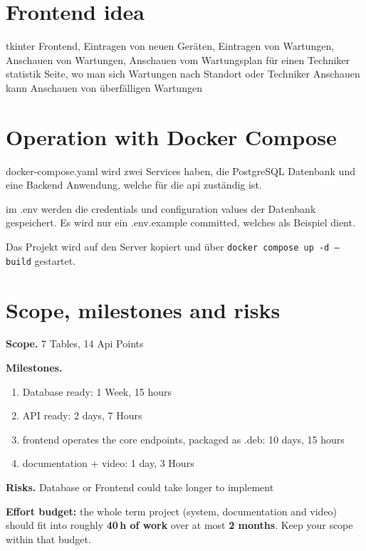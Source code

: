 \documentclass[11pt,a4paper]{article}
\begin{document}
\section{Frontend idea}

tkinter Frontend, 
Eintragen von neuen Geräten, Eintragen von Wartungen, 
Anschauen von Wartungen, Anschauen vom Wartungsplan für einen Techniker
statistik Seite, wo man sich Wartungen nach Standort oder Techniker Anschauen kann
Anschauen von überfälligen Wartungen
\section{Operation with Docker Compose}

docker-compose.yaml wird zwei Services haben, die PostgreSQL Datenbank 
und eine Backend Anwendung, welche für die api zuständig ist.

im .env werden die credentials und configuration values der Datenbank gespeichert.
Es wird nur ein .env.example committed, welches als Beispiel dient. 

Das Projekt wird auf den Server kopiert und über \texttt{docker compose up -d --build} gestartet.

\section{Scope, milestones and risks}

\textbf{Scope.} 7 Tables, 14 Api Points

\textbf{Milestones.}
\begin{enumerate}[topsep=2pt]
  \item  Database ready: 1 Week, 15 hours
  \item  API ready: 2 days, 7 Hours
  \item frontend operates the core endpoints, packaged as .deb: 10 days, 15 hours
  \item documentation + video:  1 day, 3 Hours
\end{enumerate}

\textbf{Risks.} 
Database or Frontend could take longer to implement

\vspace{1em}
\begin{infobox}
\textbf{Effort budget:} the whole term project (system, documentation and video)
should fit into roughly \textbf{40\,h of work} over at most \textbf{2 months}.
Keep your scope within that budget.
\end{infobox}
\end{document}
